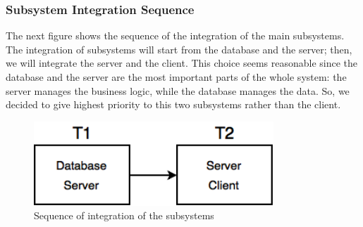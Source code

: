 \subsubsection{Subsystem Integration Sequence}
The next figure shows the sequence of the integration of the main subsystems.
\newline
The integration of subsystems will start from the database and the server; then, we will integrate the server and the client. This choice seems reasonable since the database and the server are the most important parts of the whole system: the server manages the business logic, while the database manages the data. So, we decided to give highest priority to this two subsystems rather than the client.
\newline
\begin{figure}[H]
    \centering
    \includegraphics[width=9cm]{./Images/Subsystem.png}
    \caption{Sequence of integration of the subsystems}
    \label{fig: Sequence of integration of the subsystems}
\end{figure}